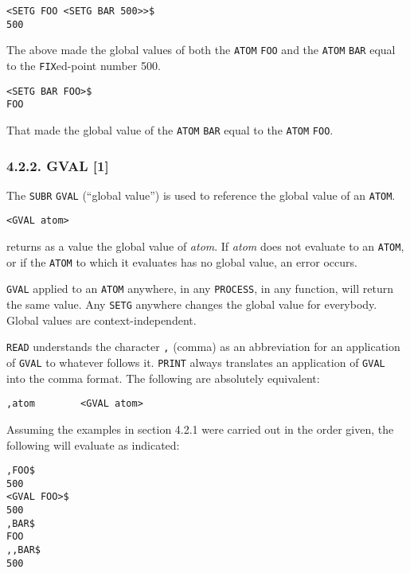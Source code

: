 \documentclass[a4paper,]{article}
\begin{document}
\begin{verbatim}
<SETG FOO <SETG BAR 500>>$
500
\end{verbatim}

The above made the global values of both the \texttt{ATOM} \texttt{FOO} and the \texttt{ATOM} \texttt{BAR} equal to the
\texttt{FIX}ed-point number 500.

\begin{verbatim}
<SETG BAR FOO>$
FOO
\end{verbatim}

That made the global value of the \texttt{ATOM} \texttt{BAR} equal to the \texttt{ATOM} \texttt{FOO}.

\subsubsection{4.2.2. GVAL {[}1{]}}\label{gval-1}

The \texttt{SUBR} \texttt{GVAL} (``global value'') is used to reference the global value of an
\texttt{ATOM}.

\begin{verbatim}
<GVAL atom>
\end{verbatim}

returns as a value the global value of \emph{atom}. If \emph{atom} does not evaluate to an \texttt{ATOM}, or if the
\texttt{ATOM} to which it evaluates has no global value, an error occurs.

\texttt{GVAL} applied to an \texttt{ATOM} anywhere, in any \texttt{PROCESS}, in any function, will return the same value.
Any \texttt{SETG} anywhere changes the global value for everybody. Global values are context-independent.

\texttt{READ} understands the character \texttt{,}  (comma) as an abbreviation for an application
of \texttt{GVAL} to whatever follows it. \texttt{PRINT} always translates an application of \texttt{GVAL} into the comma
format. The following are absolutely equivalent:

\begin{verbatim}
,atom        <GVAL atom>
\end{verbatim}

Assuming the examples in section 4.2.1 were carried out in the order given, the following will evaluate as indicated:

\begin{verbatim}
,FOO$
500
<GVAL FOO>$
500
,BAR$
FOO
,,BAR$
500
\end{verbatim}
\end{document}
